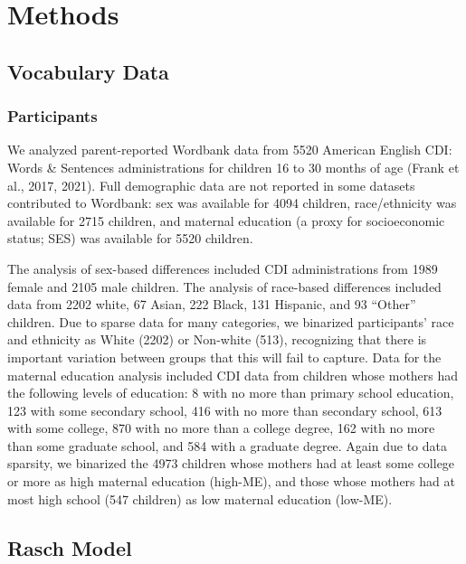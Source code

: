 \documentclass[10pt, letterpaper]{article}
\begin{document}
\hypertarget{methods}{%
\section{Methods}\label{methods}}

\hypertarget{vocabulary-data}{%
\subsection{Vocabulary Data}\label{vocabulary-data}}

\hypertarget{participants}{%
\subsubsection{Participants}\label{participants}}

We analyzed parent-reported Wordbank data from 5520 American English
CDI: Words \& Sentences administrations for children 16 to 30 months of
age (Frank et al., 2017, 2021). Full demographic data are not reported
in some datasets contributed to Wordbank: sex was available for 4094
children, race/ethnicity was available for 2715 children, and maternal
education (a proxy for socioeconomic status; SES) was available for 5520
children.

The analysis of sex-based differences included CDI administrations from
1989 female and 2105 male children. The analysis of race-based
differences included data from 2202 white, 67 Asian, 222 Black, 131
Hispanic, and 93 ``Other'' children. Due to sparse data for many
categories, we binarized participants' race and ethnicity as White
(2202) or Non-white (513), recognizing that there is important variation
between groups that this will fail to capture. Data for the maternal
education analysis included CDI data from children whose mothers had the
following levels of education: 8 with no more than primary school
education, 123 with some secondary school, 416 with no more than
secondary school, 613 with some college, 870 with no more than a college
degree, 162 with no more than some graduate school, and 584 with a
graduate degree. Again due to data sparsity, we binarized the 4973
children whose mothers had at least some college or more as high
maternal education (high-ME), and those whose mothers had at most high
school (547 children) as low maternal education (low-ME).

\hypertarget{rasch-model}{%
\subsection{Rasch Model}\label{rasch-model}}
\end{document}
